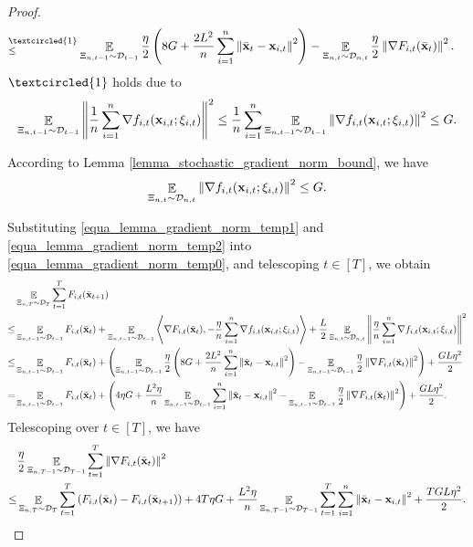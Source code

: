 \documentclass{article}
\begin{document}
\begin{proof}
\begin{align}
\refabovecir{\le}{\textcircled{1}} & \EE_{ \Xi_{n,t-1} \sim \Dcal_{t-1} } \frac{\eta}{2}\lrincir{ 8 G + \frac{2L^2}{n}\sum_{i=1}^n \lrnorm{ \bar{\x}_t - \x_{i,t} }^2 }  - \EE_{ \Xi_{n,t} \sim \Dcal_{n,t} } \frac{\eta}{2} \lrnorm{\nabla F_{i,t}(\bar{\x}_t)}^2.
\end{align} $\textcircled{1}$ holds due to  
\begin{align}
\nonumber
\mathop{\mathbb{E}}_{ \Xi_{n,t-1} \sim \mathcal{D}_{t-1} }\left\lVert\frac{1}{n}\sum_{i=1}^n \nabla  f_{i,t}({\bf x}_{i,t};\xi_{i,t})\right\rVert^2 \le \frac{1}{n}\sum_{i=1}^n  \mathop{\mathbb{E}}_{ \Xi_{n,t-1} \sim \mathcal{D}_{t-1} }\left\lVert\nabla  f_{i,t}({\bf x}_{i,t};\xi_{i,t})\right\rVert^2 \le G.
\end{align}




According to Lemma \ref{lemma_stochastic_gradient_norm_bound}, we have
\begin{align}
\label{equa_lemma_gradient_norm_temp2}
\mathop{\mathbb{E}}_{ \Xi_{n,t} \sim \mathcal{D}_{n,t} }\left\lVert \nabla f_{i,t}({\bf x}_{i,t};\xi_{i,t})\right\rVert^2 \le G.
\end{align}

Substituting \eqref{equa_lemma_gradient_norm_temp1} and \eqref{equa_lemma_gradient_norm_temp2} into \eqref{equa_lemma_gradient_norm_temp0}, and telescoping $t\in[T]$, we obtain
\begin{align}
\nonumber
& \mathop{\mathbb{E}}_{ \Xi_{n,T} \sim \mathcal{D}_{T} } \sum_{t=1}^T F_{i,t}(\bar{{\bf x}}_{t+1}) \\ \nonumber
\le & \mathop{\mathbb{E}}_{ \Xi_{n,t-1} \sim \mathcal{D}_{t-1} } F_{i,t}(\bar{{\bf x}}_t) + \mathop{\mathbb{E}}_{ \Xi_{n,t-1} \sim \mathcal{D}_{t-1} }\left\langle\nabla F_{i,t}(\bar{{\bf x}}_t), -\frac{\eta}{n}\sum_{i=1}^n \nabla f_{i,t}({\bf x}_{i,t};\xi_{i,t}) \right\rangle + \frac{L}{2} \mathop{\mathbb{E}}_{ \Xi_{n,t} \sim \mathcal{D}_{n,t} }\left\lVert\frac{\eta}{n}\sum_{i=1}^n \nabla f_{i,t}({\bf x}_{i,t};\xi_{i,t})\right\rVert^2 \\ \nonumber
\le & \mathop{\mathbb{E}}_{ \Xi_{n,t-1} \sim \mathcal{D}_{t-1} } F_{i,t}(\bar{{\bf x}}_t) + \left(  \mathop{\mathbb{E}}_{ \Xi_{n,t-1} \sim \mathcal{D}_{t-1} } \frac{\eta}{2}\left(  8 G + \frac{2L^2}{n}\sum_{i=1}^n \left\lVert \bar{{\bf x}}_t - {\bf x}_{i,t} \right\rVert^2  \right)  - \mathop{\mathbb{E}}_{ \Xi_{n,t-1} \sim \mathcal{D}_{t-1} } \frac{\eta}{2} \left\lVert\nabla F_{i,t}(\bar{{\bf x}}_t)\right\rVert^2  \right) + \frac{GL\eta^2}{2} \\ \nonumber
= & \mathop{\mathbb{E}}_{ \Xi_{n,t-1} \sim \mathcal{D}_{t-1} } F_{i,t}(\bar{{\bf x}}_t) + \left(   4\eta  G + \frac{ L^2 \eta}{n}\mathop{\mathbb{E}}_{ \Xi_{n,t-1} \sim \mathcal{D}_{t-1} }\sum_{i=1}^n \left\lVert \bar{{\bf x}}_t - {\bf x}_{i,t} \right\rVert^2   - \mathop{\mathbb{E}}_{ \Xi_{n,t-1} \sim \mathcal{D}_{t-1} } \frac{\eta}{2} \left\lVert\nabla F_{i,t}(\bar{{\bf x}}_t)\right\rVert^2  \right) + \frac{GL\eta^2}{2}.
\end{align} Telescoping over $t\in[T]$, we have
\begin{align}
& \frac{\eta}{2} \mathop{\mathbb{E}}_{ \Xi_{n,T-1} \sim \mathcal{D}_{T-1} }\sum_{t=1}^T \left\lVert\nabla F_{i,t}(\bar{{\bf x}}_t)\right\rVert^2 \\ \nonumber
\le & \mathop{\mathbb{E}}_{ \Xi_{n,T} \sim \mathcal{D}_{T} } \sum_{t=1}^T  \left( F_{i,t}(\bar{{\bf x}}_t) - F_{i,t}(\bar{{\bf x}}_{t+1}) \right) + 4T  \eta G + \frac{ L^2 \eta}{n}\mathop{\mathbb{E}}_{ \Xi_{n,T-1} \sim \mathcal{D}_{T-1} }\sum_{t=1}^T\sum_{i=1}^n \left\lVert \bar{{\bf x}}_t - {\bf x}_{i,t} \right\rVert^2 + \frac{TGL\eta^2}{2}.
\end{align} 






\end{proof}
\end{document}
